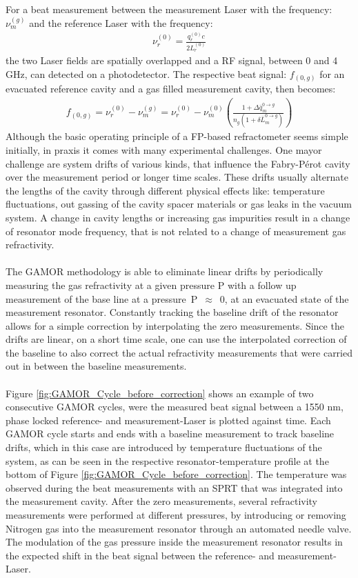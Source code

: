 \noindent
For a beat measurement between the measurement Laser with the frequency: $\nu_m^{(g)}$ and the reference Laser with the frequency:
\begin{align}
	\nu_r^{(0)}= \frac{q_r^{(0)}c}{2L_r^{(0)}}
\end{align}
the two Laser fields are spatially overlapped and a RF signal, between 0 and 4 GHz, can detected on a photodetector. The respective beat signal: $f_{(0,g)}$ for an evacuated reference cavity and a gas filled measurement cavity, then becomes: 
\begin{align}
	f_{(0,g)}= \nu_r^{(0)}- \nu_m^{(g)}=\nu_r^{(0)} - \nu_m^{(0)} \left( \frac{1+\Delta \bar{q}_m^{0\rightarrow g} }{n_g\left(1+ \delta \bar{L}_m^{0\rightarrow g} \right)}\right)
\end{align}
\noindent
Although the basic operating principle of a FP-based refractometer seems simple initially, in praxis it comes with many experimental challenges. One mayor challenge are system drifts of various kinds, that influence the Fabry-Pérot cavity over the measurement period or longer time scales. These drifts usually alternate the lengths of the cavity through different physical effects like: temperature fluctuations, out gassing of the cavity spacer materials or gas leaks in the vacuum system. A change in cavity lengths or increasing gas impurities result in a change of resonator mode frequency, that is not related to a change of measurement gas refractivity. \\\\
The GAMOR methodology is able to eliminate linear drifts by periodically measuring the gas refractivity at a given pressure P with a follow up measurement of the base line at a \mbox{pressure P $\approx$ 0}, at an evacuated state of the measurement resonator. Constantly tracking the baseline drift of the resonator allows for a simple correction by interpolating the zero measurements. Since the drifts are linear, on a short time scale, one can use the interpolated correction of the baseline to also correct the actual refractivity measurements that were carried out in between the baseline measurements. \\\\
\noindent
Figure \ref{fig:GAMOR_Cycle_before_correction} shows an example of two consecutive GAMOR cycles, were the measured beat signal between a 1550 nm, phase locked reference- and measurement-Laser is plotted against time. Each GAMOR cycle starts and ends with a baseline measurement to track baseline drifts, which in this case are introduced by temperature fluctuations of the system, as can be seen in the respective resonator-temperature profile at the bottom of Figure \ref{fig:GAMOR_Cycle_before_correction}. The temperature was observed during the beat measurements with an SPRT that was integrated into the measurement cavity. After the zero measurements, several refractivity measurements were performed at different pressures, by introducing or removing Nitrogen gas into the measurement resonator through an automated needle valve. The modulation of the gas pressure inside the measurement resonator results in the expected shift in the beat signal between the reference- and measurement-Laser.
